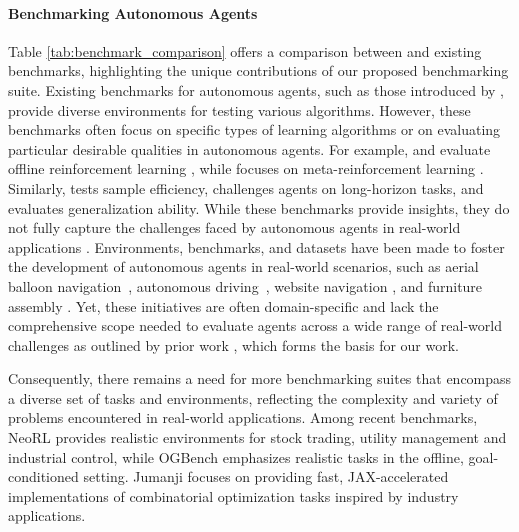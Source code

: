 
\paragraph{Benchmarking Autonomous Agents}

Table \ref{tab:benchmark_comparison} offers a comparison between \method and existing benchmarks, highlighting the unique contributions of our proposed benchmarking suite. Existing benchmarks for autonomous agents, such as those introduced by \citet{brockman2016openai, bellemare2013arcade, tassa2018deepmind}, provide diverse environments for testing various algorithms. However, these benchmarks often focus on specific types of learning algorithms or on evaluating particular desirable qualities in autonomous agents. For example, \citet{fu2020d4rl} and \citet{rl_unplugged} evaluate offline reinforcement learning \citep{levine2020offline}, while \citet{meta_world} focuses on meta-reinforcement learning \citep{wang2016learning_to_reinforcement_learn}. Similarly, \citet{ye2021mastering} tests sample efficiency, \citet{guss2019minerl} challenges agents on long-horizon tasks, and \citet{coin_run} evaluates generalization ability.
While these benchmarks provide insights, they do not fully capture the challenges faced by autonomous agents in real-world applications \citep{dulac2021challenges}.
Environments, benchmarks, and datasets have been made to foster the development of autonomous agents in real-world scenarios, such as aerial balloon navigation~\citep{balloon_learning_env}, autonomous driving~\citep{waymo_open}, website navigation \citep{gur2021environment}, and furniture assembly \citep{lee2021ikea}. Yet, these initiatives are often domain-specific and lack the comprehensive scope needed to evaluate agents across a wide range of real-world challenges  as outlined by prior work \citep{dulac2021challenges}, which forms the basis for our work.


Consequently, there remains a need for more benchmarking suites that encompass a diverse set of tasks and environments, reflecting the complexity and variety of problems encountered in real-world applications. Among recent benchmarks, NeoRL \citep{qin2022neorl} provides realistic environments for stock trading, utility management and industrial control, while OGBench \citep{park2024ogbench} emphasizes realistic tasks in the offline, goal-conditioned setting. Jumanji \citep{bonnet2023jumanji} focuses on providing fast, JAX-accelerated \citep{jax2018github} implementations of combinatorial optimization tasks inspired by industry applications.

